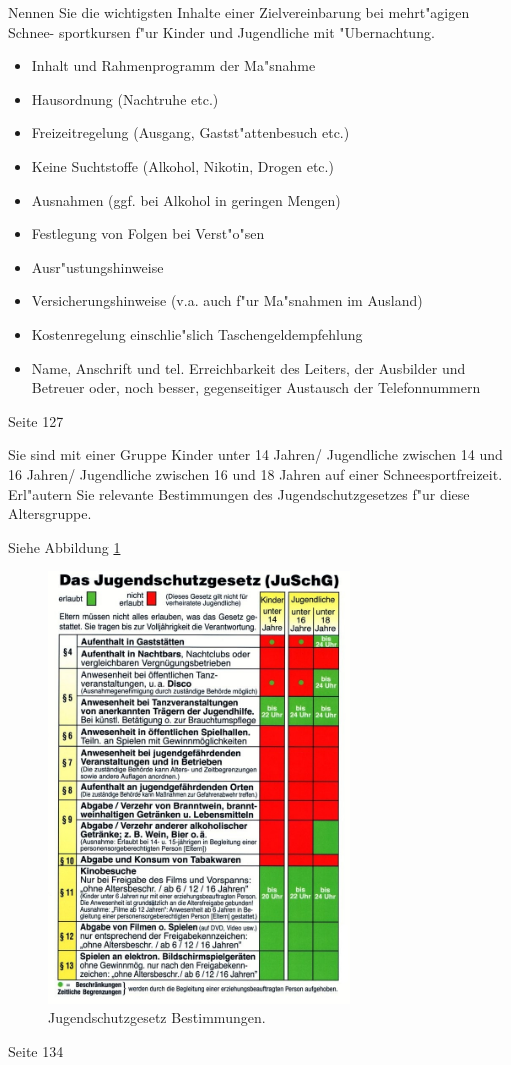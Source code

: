 \begin{question}{4}
Nennen Sie die wichtigsten Inhalte einer Zielvereinbarung bei mehrt"agigen Schnee- sportkursen f"ur Kinder und Jugendliche mit "Ubernachtung.
\end{question}
\begin{solution}
\begin{itemize}
\item Inhalt und Rahmenprogramm der Ma"snahme
\item Hausordnung (Nachtruhe etc.)
\item Freizeitregelung (Ausgang, Gastst"attenbesuch etc.)
\item Keine Suchtstoffe (Alkohol, Nikotin, Drogen etc.)
\item Ausnahmen (ggf. bei Alkohol in geringen Mengen)
\item Festlegung von Folgen bei Verst"o"sen
\item Ausr"ustungshinweise
\item Versicherungshinweise (v.a. auch f"ur Ma"snahmen im Ausland)
\item Kostenregelung einschlie"slich Taschengeldempfehlung
\item Name, Anschrift und tel. Erreichbarkeit des Leiters, der Ausbilder und Betreuer oder, noch besser, gegenseitiger Austausch der Telefonnummern
\end{itemize}
 Seite 127
\end{solution}

\begin{question}{4}
Sie sind mit einer Gruppe Kinder unter 14 Jahren/ Jugendliche zwischen 14 und 16 Jahren/ Jugendliche zwischen 16 und 18 Jahren auf einer Schneesportfreizeit. Erl"autern Sie relevante Bestimmungen des Jugendschutzgesetzes f"ur diese Altersgruppe.
\end{question}
\begin{solution}
Siehe Abbildung \ref{fig:js}
\begin{figure}[H]
  \centering
  \includegraphics[width=8cm]{js.jpg}
  \caption{Jugendschutzgesetz Bestimmungen.}
  \label{fig:js}
\end{figure}
 Seite 134
\end{solution}